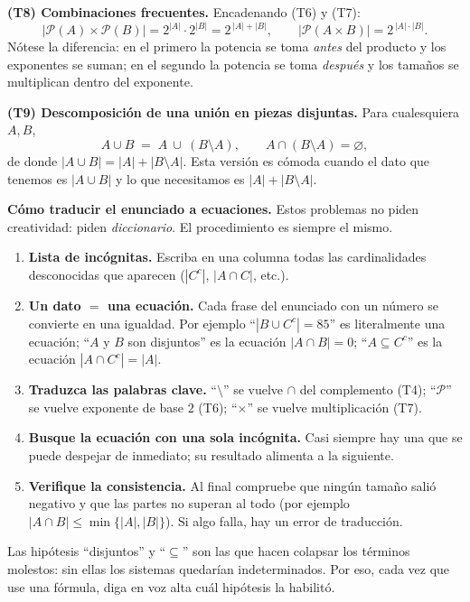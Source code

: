 \documentclass[11pt]{article}
\begin{document}
\begin{teo}
\medskip
\textbf{(T8) Combinaciones frecuentes.} Encadenando (T6) y (T7):
\[
|\mathcal{P}(A)\times\mathcal{P}(B)| = 2^{|A|}\cdot 2^{|B|} = 2^{\,|A|+|B|},
\qquad
|\mathcal{P}(A\times B)| = 2^{\,|A|\cdot|B|}.
\]
Nótese la diferencia: en el primero la potencia se toma \emph{antes} del producto y los exponentes se suman; en el segundo la potencia se toma \emph{después} y los tamaños se multiplican dentro del exponente.

\medskip
\textbf{(T9) Descomposición de una unión en piezas disjuntas.} Para cualesquiera $A,B$,
\[
A\cup B \;=\; A\ \cup\ (B\setminus A), \qquad A\cap (B\setminus A)=\varnothing,
\]
de donde $|A\cup B| = |A| + |B\setminus A|$. Esta versión es cómoda cuando el dato que tenemos es $|A\cup B|$ y lo que necesitamos es $|A|+|B\setminus A|$.
\end{teo}

\begin{tip}
\textbf{Cómo traducir el enunciado a ecuaciones.} Estos problemas no piden creatividad: piden \emph{diccionario}. El procedimiento es siempre el mismo.

\begin{enumerate}[label=\arabic*.]
  \item \textbf{Lista de incógnitas.} Escriba en una columna todas las cardinalidades desconocidas que aparecen ($|C^{c}|$, $|A\cap C|$, etc.).
  \item \textbf{Un dato $=$ una ecuación.} Cada frase del enunciado con un número se convierte en una igualdad. Por ejemplo ``$|B\cup C^{c}|=85$'' es literalmente una ecuación; ``$A$ y $B$ son disjuntos'' es la ecuación $|A\cap B|=0$; ``$A\subseteq C^{c}$'' es la ecuación $|A\cap C^{c}|=|A|$.
  \item \textbf{Traduzca las palabras clave.} ``$\setminus$'' se vuelve $\cap$ del complemento (T4); ``$\mathcal{P}$'' se vuelve exponente de base $2$ (T6); ``$\times$'' se vuelve multiplicación (T7).
  \item \textbf{Busque la ecuación con una sola incógnita.} Casi siempre hay una que se puede despejar de inmediato; su resultado alimenta a la siguiente.
  \item \textbf{Verifique la consistencia.} Al final compruebe que ningún tamaño salió negativo y que las partes no superan al todo (por ejemplo $|A\cap B|\le \min\{|A|,|B|\}$). Si algo falla, hay un error de traducción.
\end{enumerate}
Las hipótesis ``disjuntos'' y ``$\subseteq$'' son las que hacen colapsar los términos molestos: sin ellas los sistemas quedarían indeterminados. Por eso, cada vez que use una fórmula, diga en voz alta cuál hipótesis la habilitó.
\end{tip}
\end{document}
